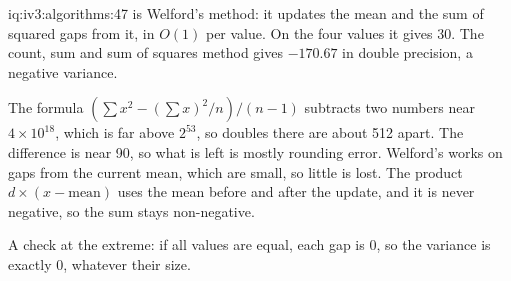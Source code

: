 \begin{solution}{iq:iv3:algorithms:47}
 is Welford's method: it updates the mean and the sum of squared gaps from it, in $O(1)$ per value. On the four values it gives 30. The count, sum and sum of squares method gives $-170.67$ in double precision, a negative variance.
\label{lst:iv3:al:welford}

The formula $(\sum x^2 - (\sum x)^2/n) / (n - 1)$ subtracts two numbers near $4 \times 10^{18}$, which is far above $2^{53}$, so doubles there are about 512 apart. The difference is near 90, so what is left is mostly rounding error. Welford's works on gaps from the current mean, which are small, so little is lost. The product $d \times (x - \text{mean})$ uses the mean before and after the update, and it is never negative, so the sum stays non-negative.

A check at the extreme: if all values are equal, each gap is 0, so the variance is exactly 0, whatever their size.

\end{solution}

